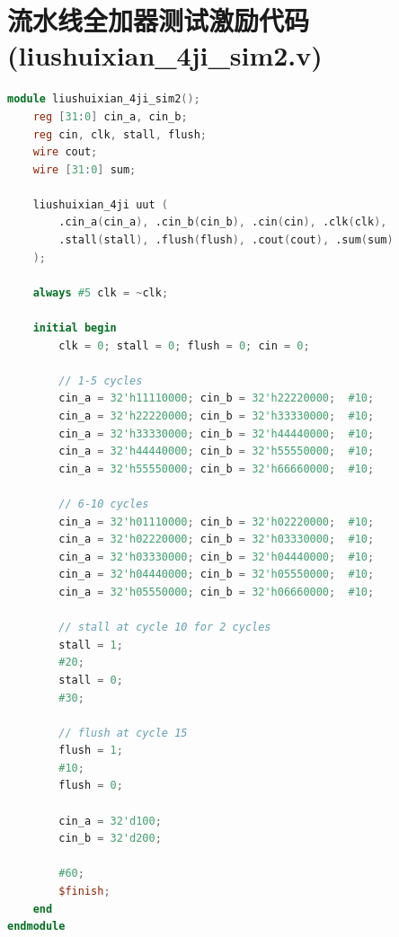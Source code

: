 \section{流水线全加器测试激励代码 (liushuixian\_4ji\_sim2.v)}

\begin{lstlisting}[language=Verilog]
module liushuixian_4ji_sim2();
    reg [31:0] cin_a, cin_b;
    reg cin, clk, stall, flush;
    wire cout;
    wire [31:0] sum;

    liushuixian_4ji uut (
        .cin_a(cin_a), .cin_b(cin_b), .cin(cin), .clk(clk),
        .stall(stall), .flush(flush), .cout(cout), .sum(sum)
    );

    always #5 clk = ~clk;

    initial begin
        clk = 0; stall = 0; flush = 0; cin = 0;

        // 1-5 cycles
        cin_a = 32'h11110000; cin_b = 32'h22220000;  #10;
        cin_a = 32'h22220000; cin_b = 32'h33330000;  #10;
        cin_a = 32'h33330000; cin_b = 32'h44440000;  #10;
        cin_a = 32'h44440000; cin_b = 32'h55550000;  #10;
        cin_a = 32'h55550000; cin_b = 32'h66660000;  #10;

        // 6-10 cycles
        cin_a = 32'h01110000; cin_b = 32'h02220000;  #10;
        cin_a = 32'h02220000; cin_b = 32'h03330000;  #10;
        cin_a = 32'h03330000; cin_b = 32'h04440000;  #10;
        cin_a = 32'h04440000; cin_b = 32'h05550000;  #10;
        cin_a = 32'h05550000; cin_b = 32'h06660000;  #10;

        // stall at cycle 10 for 2 cycles
        stall = 1;
        #20;
        stall = 0;
        #30;

        // flush at cycle 15
        flush = 1;
        #10;
        flush = 0;

        cin_a = 32'd100;
        cin_b = 32'd200;

        #60;
        $finish;
    end
endmodule
\end{lstlisting}
